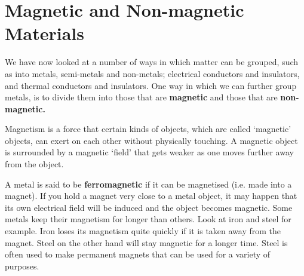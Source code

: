             \section{Magnetic and Non-magnetic Materials}
            \nopagebreak
      \label{m38706*id67151}We have now looked at a number of ways in which matter can be grouped, such as into metals, semi-metals and non-metals; electrical conductors and insulators, and thermal conductors and insulators. One way in which we can further group metals, is to divide them into those that are \textbf{magnetic} and those that are \textbf{non-magnetic.}\par 
\par
 { \label{m38706*meaningfhsst!!!underscore!!!id570}
      \label{m38706*id67174}Magnetism is a force that certain kinds of objects, which are called `magnetic' objects, can exert on each other without physically touching. A magnetic object is surrounded by a magnetic `field' that gets weaker as one moves further away from the object. \par 
       } 
\begin{minipage}{.5\textwidth}
      \label{m38706*id67186}A metal is said to be \textbf{ferromagnetic} if it can be magnetised (i.e. made into a magnet). If you hold a magnet very close to a metal object, it may happen that its own electrical field will be induced and the object becomes magnetic. Some metals keep their magnetism for longer than others. Look at iron and steel for example. Iron loses its magnetism quite quickly if it is taken away from the magnet. Steel on the other hand will stay magnetic for a longer time. Steel is often used to make permanent magnets that can be used for a variety of purposes.\par 
\end{minipage}
